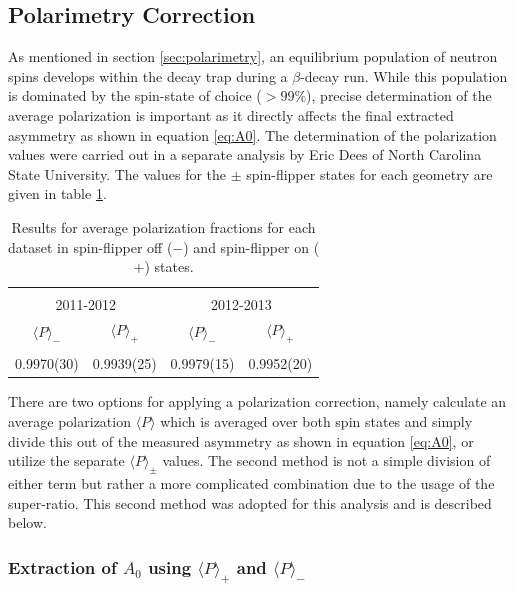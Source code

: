\subsection{Polarimetry Correction} \label{ssec:polCorr}

As mentioned in section \ref{sec:polarimetry}, an equilibrium population of neutron
spins develops within the decay trap during a $\beta$-decay run. While this population is
dominated by the spin-state of choice ($>99\%$), precise determination of the average
polarization is important as it directly affects the final extracted asymmetry as shown in
equation \ref{eq:A0}. The determination of the polarization values were carried
out in a separate analysis by Eric Dees of North Carolina State University.
The values for the $\pm$ spin-flipper states for
each geometry are given in table \ref{tab:pol}.

\setlength{\tabcolsep}{12pt}
\begin{table}[h]
  \caption{Results for average polarization fractions for each dataset in spin-flipper off ($-$)
    and spin-flipper on ($+$) states.} 
  \centering
  \begin{tabular}{c c c c}
    \hline \hline \\ [-1.75ex]
    \multicolumn{2}{c}{2011-2012}&\multicolumn{2}{c}{2012-2013} \\ [0.5ex]
    $\langle P \rangle_-$ & $\langle P \rangle_+$ & $\langle P \rangle_-$ & $\langle P\rangle_+$ \\ [0.25ex]
    \hline \\ [-1.75ex]
    0.9970(30) & 0.9939(25) & 0.9979(15) & 0.9952(20) \\ [0.25ex]
    \hline
  \end{tabular}
  \label{tab:pol}
\end{table}

There are two options for applying a polarization correction, namely
calculate an average polarization $\langle P \rangle$
which is averaged over both spin states and simply
divide this out of the measured asymmetry as shown in equation \ref{eq:A0}, or utilize the
separate $\langle P\rangle_\pm$ values. The second method is not a simple division of
either term but rather a more complicated combination due to the usage of the super-ratio.
This second method was adopted for this analysis and is described below.

\subsubsection{Extraction of $A_0$ using $\langle P \rangle_+$ and $\langle P \rangle_-$}
\label{ssec:polSep}

